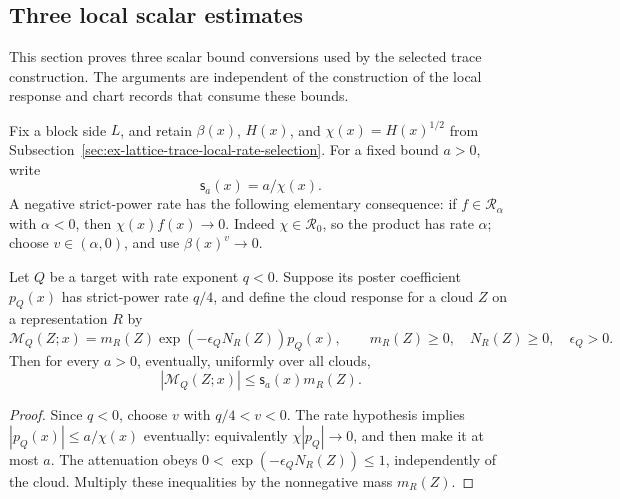 \subsection{Three local scalar estimates}
\label{sec:ex-lattice-trace-medal-prices}

This section proves three scalar bound conversions used by the selected
trace construction. The arguments are independent of the construction of the
local response and chart records that consume these bounds.

Fix a block side \(L\), and retain \(\beta(x)\), \(H(x)\), and
\(\chi(x)=H(x)^{1/2}\) from Subsection~\ref{sec:ex-lattice-trace-local-rate-selection}.
For a fixed bound \(a>0\), write
\[
                 \mathsf s_a(x)=a/\chi(x).
\]
A negative strict-power rate has the following elementary consequence: if
\(f\in\mathcal R_\alpha\) with \(\alpha<0\), then
\(\chi(x)f(x)\to0\). Indeed \(\chi\in\mathcal R_0\), so the product has
rate \(\alpha\); choose \(v\in(\alpha,0)\), and use
\(\beta(x)^v\to0\).

\begin{lemma}
\label{lem:ex-lattice-medal-cloud-price}
Let \(Q\) be a target with rate exponent \(q<0\). Suppose its poster
coefficient \(p_Q(x)\) has strict-power rate \(q/4\), and define the
cloud response for a cloud \(Z\) on a representation \(R\) by
\[
 \mathcal M_Q(Z;x)=m_R(Z)\exp(-\epsilon_Q N_R(Z))p_Q(x),
 \qquad m_R(Z)\ge0,\quad N_R(Z)\ge0,\quad \epsilon_Q>0.
\]
Then for every \(a>0\), eventually, uniformly over all clouds,
\begin{equation}
             |\mathcal M_Q(Z;x)|\le \mathsf s_a(x)m_R(Z).
 \label{eq:ex-lattice-cloud-price}
\end{equation}
\end{lemma}
\begin{proof}
Since \(q<0\), choose \(v\) with \(q/4<v<0\). The rate hypothesis
implies \(|p_Q(x)|\le a/\chi(x)\) eventually: equivalently
\(\chi|p_Q|\to0\), and then make it at most \(a\). The attenuation obeys
\(0<\exp(-\epsilon_QN_R(Z))\le1\), independently of the cloud. Multiply
these inequalities by the nonnegative mass \(m_R(Z)\).
\end{proof}

